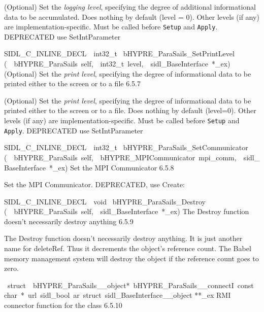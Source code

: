 \documentclass{article}
\begin{document}
\begin{cxxentry}
\begin{cxxentry}
\begin{cxxfunction}
\begin{cxxdoc}
(Optional) Set the {\it logging level}, specifying the degree
of additional informational data to be accumulated.  Does
nothing by default (level = 0).  Other levels (if any) are
implementation-specific.  Must be called before {\tt Setup}
and {\tt Apply}.
DEPRECATED   use SetIntParameter
\end{cxxdoc}
\end{cxxfunction}
\begin{cxxfunction}
{SIDL\_C\_INLINE\_DECL\ \ int32\_t\ }
        {bHYPRE\_ParaSails\_SetPrintLevel}
        {(\ \ bHYPRE\_ParaSails\ self,\ \ int32\_t\ level,\ \ sidl\_BaseInterface\ *\_ex)}
        {
(Optional) Set the {\it print level}, specifying the degree
of informational data to be printed either to the screen or
to a file}
        {6.5.7}
\begin{cxxdoc}

(Optional) Set the {\it print level}, specifying the degree
of informational data to be printed either to the screen or
to a file.  Does nothing by default (level=0).  Other levels
(if any) are implementation-specific.  Must be called before
{\tt Setup} and {\tt Apply}.
DEPRECATED   use SetIntParameter
\end{cxxdoc}
\end{cxxfunction}
\begin{cxxfunction}
{SIDL\_C\_INLINE\_DECL\ \ int32\_t\ }
        {bHYPRE\_ParaSails\_SetCommunicator}
        {(\ \ bHYPRE\_ParaSails\ self,\ \ bHYPRE\_MPICommunicator\ mpi\_comm,\ \ sidl\_BaseInterface\ *\_ex)}
        {
Set the MPI Communicator}
        {6.5.8}
\begin{cxxdoc}

Set the MPI Communicator.
DEPRECATED, use Create:
\end{cxxdoc}
\end{cxxfunction}
\begin{cxxfunction}
{SIDL\_C\_INLINE\_DECL\ \ void\ }
        {bHYPRE\_ParaSails\_Destroy}
        {(\ \ bHYPRE\_ParaSails\ self,\ \ sidl\_BaseInterface\ *\_ex)}
        {
The Destroy function doesn't necessarily destroy anything}
        {6.5.9}
\begin{cxxdoc}

The Destroy function doesn't necessarily destroy anything.
It is just another name for deleteRef.  Thus it decrements the
object's reference count.  The Babel memory management system will
destroy the object if the reference count goes to zero.
\end{cxxdoc}
\end{cxxfunction}
\begin{cxxvariable}
{\ struct\ \ bHYPRE\_ParaSails\_\_object*\ bHYPRE\_ParaSails\_\_connectI\ const\ char\ *\ url\ sidl\_bool\ ar\ struct\ sidl\_BaseInterface\_\_object}
        {**\_ex}
        {}
        {
RMI connector function for the class}
        {6.5.10}
\begin{cxxdoc}


\end{cxxdoc}
\end{cxxvariable}
\end{cxxentry}
\end{cxxentry}
\end{document}
